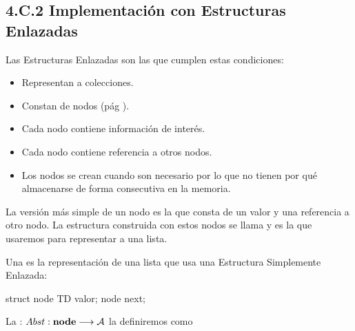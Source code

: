 
\subsection*{4.C.2 Implementación con  Estructuras Enlazadas}
\label{sec:EstructurasEnlazadas}

Las Estructuras Enlazadas son las que cumplen estas condiciones:
\begin{itemize}
\item Representan a colecciones.
\item Constan de nodos (pág \pageref{def:coneptoNodo}).
\item Cada nodo contiene información de interés.
\item Cada nodo contiene referencia a otros nodos.
\item Los nodos se crean cuando son necesario por lo que no tienen por qué almacenarse de forma consecutiva en la memoria.
\end{itemize}


La versión más simple de un nodo es la que consta de un valor y una referencia a otro nodo. La estructura construida con estos nodos se llama  y es la que usaremos para representar a una lista.

Una  es la representación de una lista que usa una Estructura Simplemente Enlazada:

\hfil
\begin{minipage}{.2\textwidth}
\begin{pyverbatim}[][frame=single]
struct node {
   TD valor;
   node next;
}
\end{pyverbatim}
\end{minipage}


La :
$
Abst: \mbox{\textbf{node}} \longrightarrow {\cal A}
$
la definiremos como

\centerline{}



